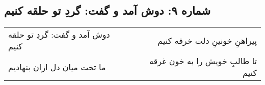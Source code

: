 \begin{center}
\section*{شماره ۹: دوش آمد و گفت: گردِ تو حلقه کنیم}
\label{sec:009}
\begin{longtable}{l p{0.5cm} r}
دوش آمد و گفت: گردِ تو حلقه کنیم
&&
پیراهنِ خونینِ دلت خرقه کنیم
\\
ما تخت میان دل ازان بنهادیم
&&
تا طالبِ خویش را به خون غرقه کنیم
\\
\end{longtable}
\end{center}
